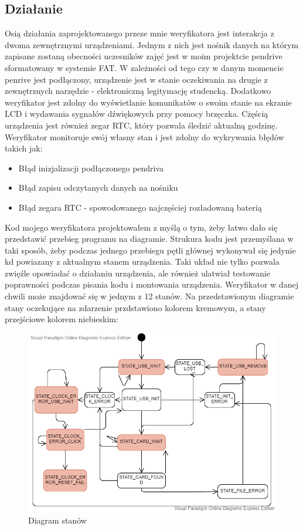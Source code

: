 \documentclass[declaration,shortabstract, mgr]{iithesis}
\begin{document}
\subsection{Działanie}
\indent Osią działania zaprojektowanego przeze mnie weryfikatora jest interakcja z dwoma zewnętrznymi urządzeniami. Jednym z nich jest nośnik danych na którym zapisane zostaną obecności uczesników zajęć jest w moim projektcie pendrive sformatowany w systemie FAT. W zależności od tego czy w danym momencie penrive jest podłączony, urządzenie jest w stanie oczekiwania na drugie z zewnętrznych narzędzie - elektroniczną legitymację studencką. Dodatkowo weryfikator jest zdolny do wyświetlanie komunikatów o swoim stanie na ekranie LCD i wydawania sygnałów dźwiękowych przy pomocy brzęczka. Cżęścią urządzenia jest również zegar RTC, który pozwala śledzić aktualną godzinę. Weryfikator monitoruje swój własny stan i jest zdolny do wykrywania błędów takich jak:
\begin{itemize}
\item Błąd inizjalizacji podłączonego pendriva
\item Błąd zapisu odczytanych danych na nośniku
\item Błąd zegara RTC - spowodowanego najczęściej rozładowaną baterią
\end{itemize}
\indent Kod mojego weryfikatora projektowałem z myślą o tym, żeby łatwo dało się przedstawić przebieg programu na diagramie. Strukura kodu jest przemyślana w taki sposób, żeby podczas jednego przebiegu pętli głównej wykonywał się jedynie kd powiazany z aktualnym stanem urządzenia. Taki układ nie tylko pozwala zwięźle opowiadać o działaniu urządzenia, ale również ulatwiał testowanie poprawności podczas pisania kodu i montowania urządzenia.
\indent Weryfikator w danej chwili może znajdować się w jednym z 12 stanów. Na przedstawionym diagramie stany oczekujące na zdarzenie przdstawiono kolorem kremowym, a stany przejściowe kolorem niebieskim:
\begin{figure}[h]
\caption{Diagram stanów}
\centering
\includegraphics[scale=0.6]{state_machine.png}
\end{figure}
\end{document}
